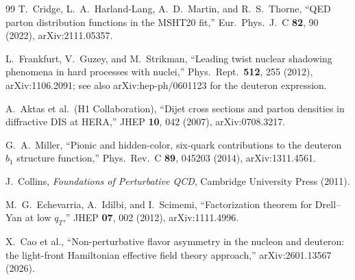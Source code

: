 \documentclass[11pt]{article}
\begin{document}
\begin{thebibliography}{99}
T.~Cridge, L.~A.~Harland-Lang, A.~D.~Martin, and R.~S.~Thorne,
``QED parton distribution functions in the MSHT20 fit,''
Eur.\ Phys.\ J.\ C \textbf{82}, 90 (2022), arXiv:2111.05357.

L.~Frankfurt, V.~Guzey, and M.~Strikman,
``Leading twist nuclear shadowing phenomena in hard processes with
nuclei,'' Phys.\ Rept.\ \textbf{512}, 255 (2012),
arXiv:1106.2091; see also arXiv:hep-ph/0601123 for the deuteron expression.

A.~Aktas et al.\ (H1 Collaboration),
``Dijet cross sections and parton densities in diffractive DIS at HERA,''
JHEP \textbf{10}, 042 (2007), arXiv:0708.3217.

G.~A.~Miller,
``Pionic and hidden-color, six-quark contributions to the deuteron
\(b_1\) structure function,'' Phys.\ Rev.\ C \textbf{89}, 045203 (2014),
arXiv:1311.4561.

J.~Collins, \emph{Foundations of Perturbative QCD},
Cambridge University Press (2011).

M.~G.~Echevarria, A.~Idilbi, and I.~Scimemi,
``Factorization theorem for Drell--Yan at low \(q_T\),''
JHEP \textbf{07}, 002 (2012), arXiv:1111.4996.

X.~Cao et al.,
``Non-perturbative flavor asymmetry in the nucleon and deuteron: the
light-front Hamiltonian effective field theory approach,''
arXiv:2601.13567 (2026).

\end{thebibliography}
\end{document}
